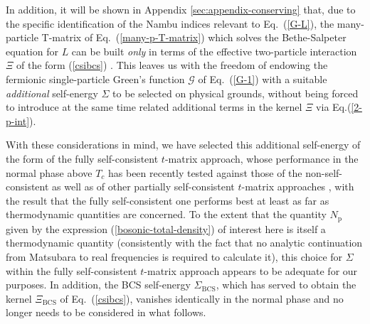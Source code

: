 \documentclass[pra,twocolumn,aps,amssymb,showpacs,superscriptaddress]{revtex4-1}
\begin{document}
In addition, it will be shown in Appendix \ref{sec:appendix-conserving} that, due to the specific identification of the Nambu indices relevant to Eq.~(\ref{G-L}), the many-particle T-matrix of Eq.~(\ref{many-p-T-matrix}) 
which solves the Bethe-Salpeter equation for $L$ can be built \emph{only} in terms of the effective two-particle interaction $\Xi$ of the form (\ref{csibcs}) \cite{footnote-GMB}.
This leaves us with the freedom of endowing the fermionic single-particle Green's function $\mathcal{G}$ of Eq.~(\ref{G-1}) with a suitable \emph{additional} self-energy $\Sigma$ to be selected on physical grounds, without being forced to introduce at the same time related additional terms in the kernel $\Xi$ via Eq.(\ref{2-p-int}).

With these considerations in mind, we have selected this additional self-energy of the form of the fully self-consistent $t$-matrix approach, whose performance in the normal phase above $T_{c}$ 
has been recently tested against those of the non-self-consistent as well as of other partially self-consistent $t$-matrix approaches \cite{PPS-2019}, with the result that the fully self-consistent one performs best at least as far as thermodynamic quantities are concerned.
To the extent that the quantity $N_{\mathrm{p}}$ given by the expression (\ref{bosonic-total-density}) of interest here is itself a thermodynamic quantity (consistently with the fact that no analytic continuation from Matsubara  to real frequencies is required to calculate it), this choice for $\Sigma$ within the fully self-consistent $t$-matrix approach appears to be adequate for our purposes.
In addition, the BCS self-energy $\Sigma_{\mathrm{BCS}}$, which has served to obtain the kernel $\Xi_{\mathrm{BCS}}$ of Eq.~(\ref{csibcs}), vanishes identically in the normal phase and no longer 
needs to be considered in what follows.
\end{document}
